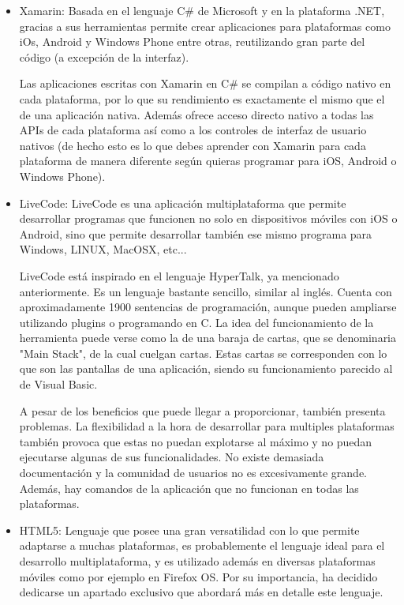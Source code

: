 \documentclass[
10pt, %
a4paper, %
oneside, %
headinclude,footinclude, %
BCOR5mm, %
]{scrartcl}
\begin{document}
\begin{itemize}
	\item Xamarin: Basada en el lenguaje C\# de Microsoft y en la plataforma .NET, gracias a sus herramientas permite crear aplicaciones para plataformas como iOs, Android y Windows Phone entre otras, reutilizando gran parte del código (a excepción de la interfaz).

	Las aplicaciones escritas con Xamarin en C\# se compilan a código nativo en cada plataforma, por lo que su rendimiento es exactamente el mismo que el de una aplicación nativa. Además ofrece acceso directo nativo a todas las APIs de cada plataforma así como a los controles de interfaz de usuario nativos (de hecho esto es lo que debes aprender con Xamarin para cada plataforma de manera diferente según quieras programar para iOS, Android o Windows Phone).

	\item LiveCode: LiveCode es una aplicación multiplataforma que permite desarrollar programas que funcionen no solo en dispositivos móviles con iOS o Android, sino que permite desarrollar también ese mismo programa para Windows, LINUX, MacOSX, etc...

	LiveCode está inspirado en el lenguaje HyperTalk, ya mencionado anteriormente. Es un lenguaje bastante sencillo, similar al inglés. Cuenta con aproximadamente 1900 sentencias de programación, aunque pueden ampliarse utilizando plugins o programando en C. La idea del funcionamiento de la herramienta puede verse como la de una baraja de cartas, que se denominaria "Main Stack", de la cual cuelgan cartas. Estas cartas se corresponden con lo que son las pantallas de una aplicación, siendo su funcionamiento parecido al de Visual Basic.

	A pesar de los beneficios que puede llegar a proporcionar, también presenta problemas. La flexibilidad a la hora de desarrollar para multiples plataformas también provoca que estas no puedan explotarse al máximo y no puedan ejecutarse algunas de sus funcionalidades. No existe demasiada documentación y la comunidad de usuarios no es excesivamente grande. Además, hay comandos de la aplicación que no funcionan en todas las plataformas.

	\item HTML5: Lenguaje que posee una gran versatilidad con lo que permite adaptarse a muchas plataformas, es probablemente el lenguaje ideal para el desarrollo multiplataforma, y es utilizado además en diversas plataformas móviles como por ejemplo en Firefox OS. Por su importancia, ha decidido dedicarse un apartado exclusivo que abordará más en detalle este lenguaje.


\end{itemize}
\end{document}
